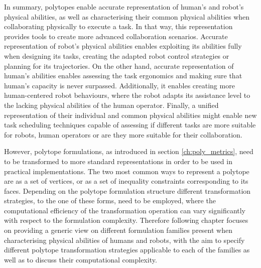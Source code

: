 In summary, polytopes enable accurate representation of human's and robot's physical abilities, as well as characterising their common physical abilities when collaborating physically to execute a task. In that way, this representation provides tools to create more advanced collaboration scenarios. 
Accurate representation of robot's physical abilities enables exploiting its abilities fully when designing its tasks, creating the adapted robot control strategies or planning for its trajectories. On the other hand, accurate representation of human's abilities enables assessing the task ergonomics and making sure that human's capacity is never surpassed. Additionally, it enables creating more human-centered robot behaviours, where the robot adapts its assistance level to the lacking physical abilities of the human operator. 
Finally, a unified representation of their individual and common physical abilities might enable new task scheduling techniques capable of assessing if different tasks are more suitable for robots, human operators or are they more suitable for their collaboration. 

However, polytope formulations, as introduced in section \ref{ch:poly_metrics}, need to be transformed to more standard representations in order to  be used in practical implementations. The two most common ways to represent a polytope are as a set of vertices, or as a set of inequality constraints corresponding to its faces. Depending on the polytope formulation structure different transformation strategies, to the one of these forms, need to be employed, where the computational efficiency of the transformation operation can vary significantly with respect to the formulation complexity. Therefore following chapter focuses on providing a generic view on different formulation families present when characterising physical abilities of humans and robots, with the aim to specify different polytope transformation strategies applicable to each of the families as well as to discuss their computational complexity.



